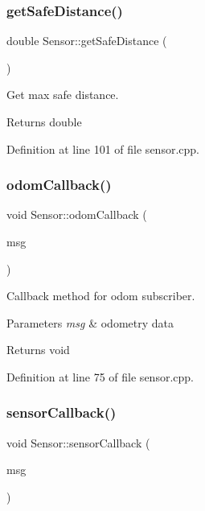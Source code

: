 \subsubsection{\texorpdfstring{get\+Safe\+Distance()}{getSafeDistance()}}
{\footnotesize\ttfamily double Sensor\+::get\+Safe\+Distance (\begin{DoxyParamCaption}{ }\end{DoxyParamCaption})}



Get max safe distance. 

\begin{DoxyReturn}{Returns}
double 
\end{DoxyReturn}


Definition at line 101 of file sensor.\+cpp.

\mbox{\label{class_sensor_a69dc2c8fc57c2b421913fda9b1e19fbc}} 
\subsubsection{\texorpdfstring{odom\+Callback()}{odomCallback()}}
{\footnotesize\ttfamily void Sensor\+::odom\+Callback (\begin{DoxyParamCaption}\item[{const nav\+\_\+msgs\+::\+Odometry\+::\+Const\+Ptr \&}]{msg }\end{DoxyParamCaption})}



Callback method for odom subscriber. 


\begin{DoxyParams}{Parameters}
{\em msg} & odometry data \\
\hline
\end{DoxyParams}
\begin{DoxyReturn}{Returns}
void 
\end{DoxyReturn}


Definition at line 75 of file sensor.\+cpp.

\mbox{\label{class_sensor_abc654feeb9c9b67efcda04b62072d828}} 
\subsubsection{\texorpdfstring{sensor\+Callback()}{sensorCallback()}}
{\footnotesize\ttfamily void Sensor\+::sensor\+Callback (\begin{DoxyParamCaption}\item[{const sensor\+\_\+msgs\+::\+Laser\+Scan\+::\+Const\+Ptr \&}]{msg }\end{DoxyParamCaption})}



